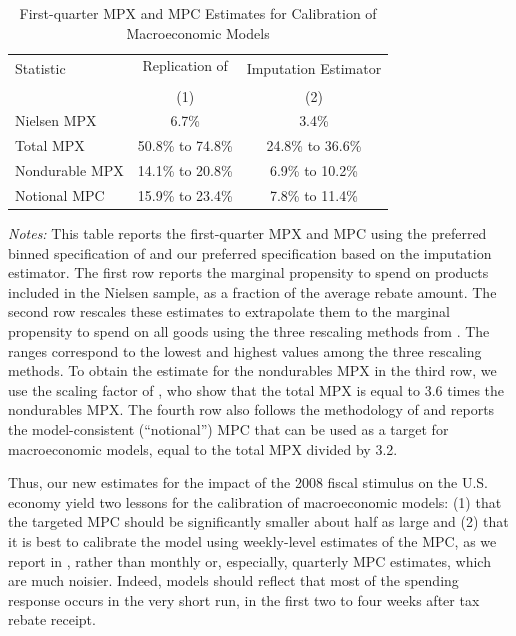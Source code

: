 \documentclass[english,11pt]{article}
\providecommand{\tabularnewline}{\\}
\theoremstyle{plain}
\theoremstyle{plain}
\theoremstyle{plain}
\theoremstyle{plain}
\let\ref\Cref
\begin{document}
{\small{}}
\begin{table}[t]
{\small{}\caption{{\small{}First-quarter MPX and MPC Estimates for Calibration of Macroeconomic
Models\label{tab:macro_models}}}
\medskip{}
}{\small\par}
\begin{centering}
{\small{}}%
\begin{tabular}{lcc}
\toprule 
\multirow{2}{*}{{\small{}Statistic}} & {\small{}Replication of} & \multirow{2}{*}{{\small{}Imputation Estimator}}\tabularnewline
 & {\small{}\textcite{Broda2014}} & \tabularnewline
 & {\small{}(1)} & {\small{}(2)}\tabularnewline
\midrule
{\small{}Nielsen MPX} & {\small{}6.7\%} & {\small{}3.4\%}\tabularnewline
{\small{}Total MPX} & {\small{}50.8\% to 74.8\%} & {\small{}24.8\% to 36.6\%}\tabularnewline
{\small{}Nondurable MPX} & {\small{}14.1\% to 20.8\%} & {\small{}6.9\% to 10.2\%}\tabularnewline
{\small{}Notional MPC} & {\small{}15.9\% to 23.4\%} & {\small{}7.8\% to 11.4\%}\tabularnewline
\bottomrule
\end{tabular}{\small{}\medskip{}
}{\small\par}
\par\end{centering}
\emph{\footnotesize{}Notes:}{\footnotesize{} This table reports the
first-quarter MPX and MPC using the preferred binned specification
of \textcite{Broda2014} and our preferred specification based on
the imputation estimator. The first row reports the marginal propensity
to spend on products included in the Nielsen sample, as a fraction
of the average rebate amount. The second row rescales these estimates
to extrapolate them to the marginal propensity to spend on all goods
using the three rescaling methods from \textcite{Broda2014}. The
ranges correspond to the lowest and highest values among the three
rescaling methods. To obtain the estimate for the nondurables MPX
in the third row, we use the scaling factor of \textcite{Laibson2022},
who show that the total MPX is equal to 3.6 times the nondurables
MPX. The fourth row also follows the methodology of \textcite{Laibson2022}
and reports the model-consistent (``notional'') MPC that can be
used as a target for macroeconomic models, equal to the total MPX
divided by 3.2.}{\footnotesize\par}
\end{table}
{\small\par}

Thus, our new estimates for the impact of the 2008 fiscal stimulus
on the U.S. economy yield two lessons for the calibration of macroeconomic
models: (1) that the targeted MPC should be significantly smaller
\textemdash{} about half as large \textemdash{} and (2) that it is
best to calibrate the model using weekly-level estimates of the MPC,
as we report in \ref{fig:OLS vs. robust imputation estimator}, rather
than monthly or, especially, quarterly MPC estimates, which are much
noisier. Indeed, models should reflect that most of the spending response
occurs in the very short run, in the first two to four weeks after
tax rebate receipt. 
\end{document}

